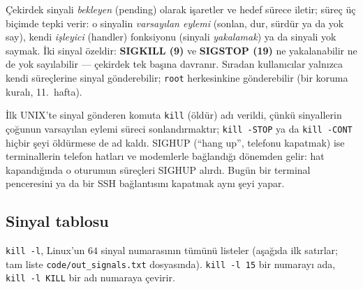 \documentclass[11pt,a4paper]{article}
\newcommand{\cmd}[1]{\texttt{#1}}
\begin{document}
Çekirdek sinyali \emph{bekleyen} (pending) olarak işaretler ve hedef sürece iletir; süreç üç biçimde tepki verir: o sinyalin \emph{varsayılan eylemi} (sonlan, dur, sürdür ya da yok say), kendi \emph{işleyici} (handler) fonksiyonu (sinyali \emph{yakalamak}) ya da sinyali yok saymak. İki sinyal özeldir: \textbf{SIGKILL (9)} ve \textbf{SIGSTOP (19)} ne yakalanabilir ne de yok sayılabilir --- çekirdek tek başına davranır. Sıradan kullanıcılar yalnızca kendi süreçlerine sinyal gönderebilir; \texttt{root} herkesinkine gönderebilir (bir koruma kuralı, 11.~hafta).

\begin{histnote}
İlk UNIX'te sinyal gönderen komuta \cmd{kill} (öldür) adı verildi, çünkü sinyallerin çoğunun varsayılan eylemi süreci sonlandırmaktır; \cmd{kill -STOP} ya da \cmd{kill -CONT} hiçbir şeyi öldürmese de ad kaldı. SIGHUP (``hang up'', telefonu kapatmak) ise terminallerin telefon hatları ve modemlerle bağlandığı dönemden gelir: hat kapandığında o oturumun süreçleri SIGHUP alırdı. Bugün bir terminal penceresini ya da bir SSH bağlantısını kapatmak aynı şeyi yapar.
\end{histnote}

\subsection{Sinyal tablosu}
\label{sec:sigtable}

\cmd{kill -l}, Linux'un $64$ sinyal numarasının tümünü listeler (aşağıda ilk satırlar; tam liste \texttt{code/\allowbreak out\_signals.txt} dosyasında). \cmd{kill -l 15} bir numarayı ada, \cmd{kill -l KILL} bir adı numaraya çevirir.


\end{document}
